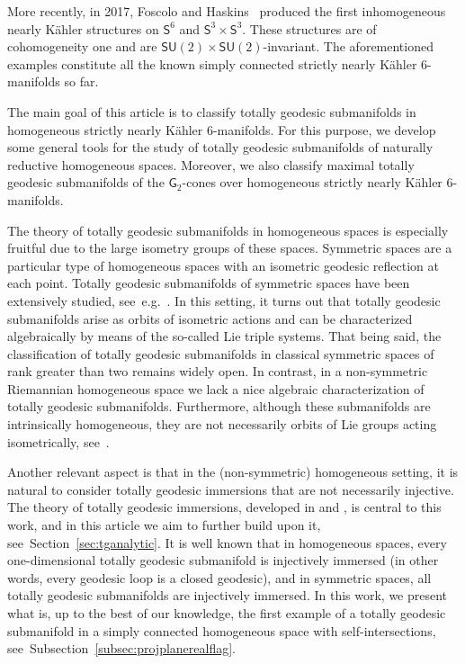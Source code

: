 \documentclass[11pt,a4paper,final]{amsart}
\newcommand{\s}{\mathsf}
\theoremstyle{definition}
\begin{document}
More recently, in 2017, Foscolo and Haskins~\cite{foscolo} produced the first inhomogeneous nearly Kähler structures on $\s{S}^6$ and $\s{S}^3\times\s{S}^3$.
These structures are of cohomogeneity one and are $\s{SU}(2)\times\s{SU}(2)$-invariant.
The aforementioned examples constitute all the known simply connected  strictly nearly Kähler $6$-manifolds so far.

The main goal of this article is to classify totally geodesic submanifolds in homogeneous strictly nearly Kähler $6$-manifolds. For this purpose, we develop some general tools for the study of totally geodesic submanifolds of naturally reductive homogeneous spaces.
Moreover, we also classify maximal totally geodesic submanifolds of the $\s{G}_2$-cones over homogeneous strictly nearly Kähler $6$-manifolds.

The theory of totally geodesic submanifolds in homogeneous spaces is especially fruitful due to the large isometry groups of these spaces.  Symmetric spaces are a particular type of homogeneous spaces with an isometric geodesic reflection at each point.
Totally geodesic submanifolds of symmetric spaces have been extensively studied, see~e.g.~\cite{BO1,chen1,chen2,exceptional}.
In this setting, it turns out that totally geodesic submanifolds arise as orbits of isometric actions and can be characterized algebraically by means of the so-called Lie triple systems.
That being said, the classification of totally geodesic submanifolds in classical symmetric spaces of rank greater than two remains widely open.
In contrast, in a non-symmetric Riemannian homogeneous space we lack a nice algebraic characterization of totally geodesic submanifolds.
Furthermore, although these submanifolds are intrinsically homogeneous, they are not necessarily orbits of Lie groups acting isometrically, see~\cite{nikolayevskytg,RodriguezVazquezOlmos}. 

Another relevant aspect is that in the (non-symmetric) homogeneous setting, it is natural to consider totally geodesic immersions that are not necessarily injective.
The theory of totally geodesic immersions, developed in \cite{Tsukada}  and \cite{HeintzeLiuOlmos}, is central to this work, and in this article we aim to further build upon it, see~Section~\ref{sec:tganalytic}.
It is well known that in homogeneous spaces, every one-dimensional totally geodesic submanifold is injectively immersed (in other words, every geodesic loop is a closed geodesic), and in symmetric spaces, all totally geodesic submanifolds are injectively immersed.
In this work, we present what is, up to the best of our knowledge, the first example of a totally geodesic submanifold  in a simply connected homogeneous space with self-intersections, see~Subsection~\ref{subsec:projplanerealflag}.
\end{document}
